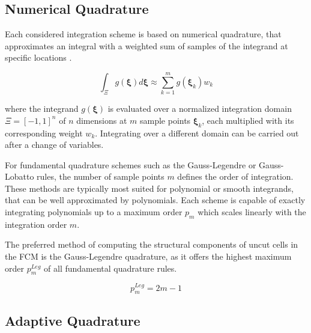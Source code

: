 \subsection{Numerical Quadrature}
\label{subsection:numerical_quadrature}

Each considered integration scheme is based on numerical quadrature, that approximates an integral with a weighted sum of samples of the integrand at specific locations \cite{Atkinson1988}.

\begin{equation}
	\int_{\Xi} g(\boldsymbol{\xi}) d\boldsymbol{\xi} \approx \sum_{k=1}^m g(\boldsymbol{\xi}_k) w_k
\end{equation}

where the integrand $g(\boldsymbol{\xi})$ is evaluated over a normalized integration domain $\Xi = [-1,1]^n$ of $n$ dimensions at $m$ sample points $\boldsymbol{\xi}_k$, each multiplied with its corresponding weight $w_k$. Integrating over a different domain can be carried out after a change of variables.

For fundamental quadrature schemes such as the Gauss-Legendre or Gauss-Lobatto rules, the number of sample points $m$ defines the order of integration. These methods are typically most suited for polynomial or smooth integrands, that can be well approximated by polynomials. Each scheme is capable of exactly integrating polynomials up to a maximum order $p_m$ which scales linearly with the integration order $m$.

The preferred method of computing the structural components of uncut cells in the FCM is the Gauss-Legendre quadrature, as it offers the highest maximum order $p_m^{Leg}$ of all fundamental quadrature rules.

\begin{equation} \label{eq:gauss_legendre_maximum_order}
	p_m^{Leg} = 2m - 1
\end{equation}

\subsection{Adaptive Quadrature}
\label{subsection:adaptive_quadrature}

